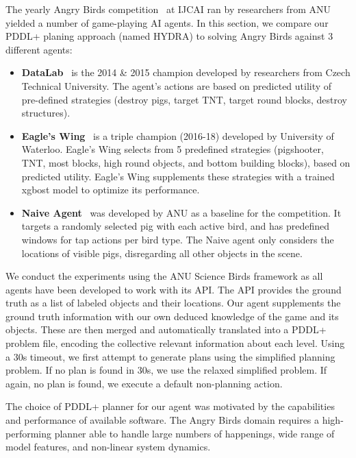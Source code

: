 The yearly Angry Birds competition~\cite{renz2015aibirds} at IJCAI ran by researchers from ANU yielded a number of game-playing AI agents. In this section, we compare our PDDL+ planing approach (named HYDRA) to solving Angry Birds against 3 different agents:

\begin{itemize}
    \item \textbf{DataLab}~\cite{borovicka2014datalab} is the 2014 \& 2015 champion developed by researchers from Czech Technical University. The agent's actions are based on predicted utility of pre-defined strategies (destroy pigs, target TNT, target round blocks, destroy structures).
    \item \textbf{Eagle's Wing}~\cite{wang2017description} is a triple champion (2016-18) developed by University of Waterloo. Eagle's Wing selects from 5 predefined strategies (pigshooter, TNT, most blocks, high round objects, and bottom building blocks), based on predicted utility. Eagle's Wing supplements these strategies with a trained xgbost model to optimize its performance.
    \item \textbf{Naive Agent}~\cite{stephenson2017creating} was developed by ANU as a baseline for the competition. It targets a randomly selected pig with each active bird, and has predefined windows for tap actions per bird type. The Naive agent only considers the locations of visible pigs, disregarding all other objects in the scene.
\end{itemize}

We conduct the experiments using the ANU Science Birds framework as all agents have been developed to work with its API. The API provides the ground truth as a list of labeled objects and their locations. Our agent supplements the ground truth information with our own deduced knowledge of the game and its objects. These are then merged and automatically translated into a PDDL+ problem file, encoding the collective relevant information about each level. Using a 30s timeout, we first attempt to generate plans using the simplified planning problem. If no plan is found in 30s, we use the relaxed simplified problem. If again, no plan is found, we execute a default non-planning action.

The choice of PDDL+ planner for our agent was motivated by the capabilities and performance of available software. The Angry Birds domain requires a high-performing planner able to handle large numbers of happenings, wide range of model features, and non-linear system dynamics.

